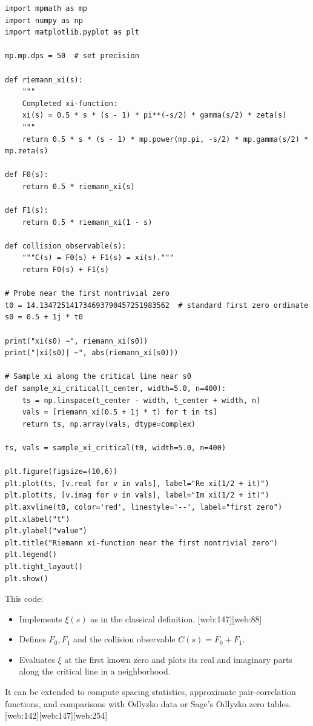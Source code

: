 \documentclass[11pt]{article}
\begin{document}
\begin{verbatim}
import mpmath as mp
import numpy as np
import matplotlib.pyplot as plt

mp.mp.dps = 50  # set precision

def riemann_xi(s):
    """
    Completed xi-function:
    xi(s) = 0.5 * s * (s - 1) * pi**(-s/2) * gamma(s/2) * zeta(s)
    """
    return 0.5 * s * (s - 1) * mp.power(mp.pi, -s/2) * mp.gamma(s/2) * mp.zeta(s)

def F0(s):
    return 0.5 * riemann_xi(s)

def F1(s):
    return 0.5 * riemann_xi(1 - s)

def collision_observable(s):
    """C(s) = F0(s) + F1(s) = xi(s)."""
    return F0(s) + F1(s)

# Probe near the first nontrivial zero
t0 = 14.134725141734693790457251983562  # standard first zero ordinate
s0 = 0.5 + 1j * t0

print("xi(s0) ~", riemann_xi(s0))
print("|xi(s0)| ~", abs(riemann_xi(s0)))

# Sample xi along the critical line near s0
def sample_xi_critical(t_center, width=5.0, n=400):
    ts = np.linspace(t_center - width, t_center + width, n)
    vals = [riemann_xi(0.5 + 1j * t) for t in ts]
    return ts, np.array(vals, dtype=complex)

ts, vals = sample_xi_critical(t0, width=5.0, n=400)

plt.figure(figsize=(10,6))
plt.plot(ts, [v.real for v in vals], label="Re xi(1/2 + it)")
plt.plot(ts, [v.imag for v in vals], label="Im xi(1/2 + it)")
plt.axvline(t0, color='red', linestyle='--', label="first zero")
plt.xlabel("t")
plt.ylabel("value")
plt.title("Riemann xi-function near the first nontrivial zero")
plt.legend()
plt.tight_layout()
plt.show()
\end{verbatim}

This code:
\begin{itemize}
  \item Implements $\xi(s)$ as in the classical definition. [web:147][web:88]
  \item Defines $F_0,F_1$ and the collision observable $C(s)=F_0+F_1$.
  \item Evaluates $\xi$ at the first known zero and plots its real and imaginary parts along the critical line in a neighborhood.  
\end{itemize}
It can be extended to compute spacing statistics, approximate pair-correlation functions, and comparisons with Odlyzko data or Sage's Odlyzko zero tables. [web:142][web:147][web:254]
\end{document}
